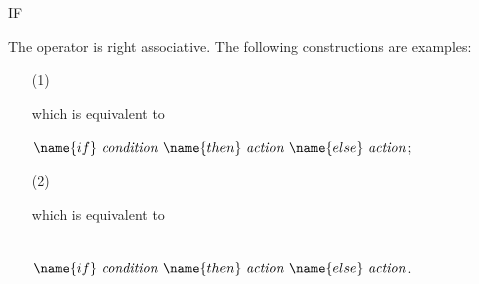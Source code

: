 \begin{Command}[if]{IF}
\begin{Comments}
The  operator is right associative.  The following constructions are
examples:
\begin{itemize}
\item[(1)]
\begin{Syntax}
     
            
\end{Syntax}

which is equivalent to
\begin{Syntax}
   \(\name{if}\ \meta{condition}
\ \name{then}\ \meta{action}\ \name{else}\ \meta{action}\);
\end{Syntax}

\item[(2)]
\begin{Syntax}
    
     
\end{Syntax}
which is equivalent to
\begin{Syntax}
\     \\
    \(\name{if}\ \meta{condition}\ \name{then}\ \meta{action}
\ \name{else}\ \meta{action}\).
\end{Syntax}
\end{itemize}
\end{Comments}
\end{Command}


